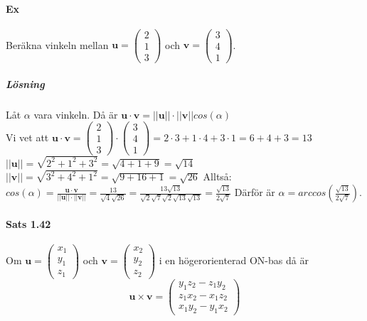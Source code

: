 \paragraph{Ex} Beräkna vinkeln mellan $\bm{u}=\begin{pmatrix}2\\1\\3\end{pmatrix}$ och $\bm{v}=\begin{pmatrix}3\\4\\1\end{pmatrix}$.
\subparagraph{Lösning} Låt $\alpha$ vara vinkeln. Då är $\bm{u}\cdot \bm{v} = ||\bm{u}||\cdot ||\bm{v}||cos(\alpha)$\\
Vi vet att $\bm{u}\cdot \bm{v}=\begin{pmatrix}2\\1\\3\end{pmatrix}\cdot \begin{pmatrix}3\\4\\1\end{pmatrix}=2\cdot 3+1\cdot 4+3\cdot 1=6+4+3=13$
$||\bm{u}||=\sqrt{2^{2}+1^{2}+3^{2}}=\sqrt{4+1+9}=\sqrt{14}$
$||\bm{v}||=\sqrt{3^{2}+4^{2}+1^{2}}=\sqrt{9+16+1}=\sqrt{26}$
Alltså: $cos(\alpha)=\frac{\bm{u}\cdot \bm{v}}{||\bm{u}||\cdot ||\bm{v}||}=\frac{13}{\sqrt{4}\sqrt{26}}=\frac{13\sqrt{13}}{\sqrt{2}\sqrt{7}\sqrt{2}\sqrt{13}\sqrt{13}}=\frac{\sqrt{13}}{2\sqrt{7}}$
Därför är $\alpha=arccos(\frac{\sqrt{13}}{2\sqrt{7}})$.

\paragraph{Sats 1.42} Om $\bm{u}=\begin{pmatrix}x_{1}\\y_{1}\\z_{1}\end{pmatrix}$ och $\bm{v}=\begin{pmatrix}x_{2}\\y_{2}\\z_{2}\end{pmatrix}$ i en högerorienterad ON-bas då är 
\begin{equation*}
    \bm{u}\times \bm{v}=\begin{pmatrix}
        y_{1}z_{2}-z_{1}y_{2}\\
        z_{1}x_{2}-x_{1}z_{2}\\
        x_{1}y_{2}-y_{1}x_{2}
    \end{pmatrix}
\end{equation*}


